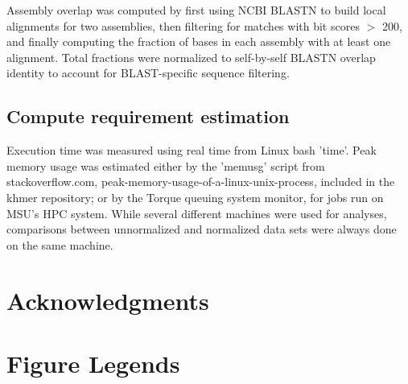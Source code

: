 \documentclass[10pt]{article}
\begin{document}
Assembly overlap was computed by first using NCBI BLASTN to build local
alignments for two assemblies, then filtering for matches with bit scores
$>$ 200, and finally computing the fraction of bases in each assembly
with at least one alignment.  Total fractions were normalized to
self-by-self BLASTN overlap identity to account for BLAST-specific
sequence filtering.

\subsection*{Compute requirement estimation}

Execution time was measured using real time from Linux bash 'time'.
Peak memory usage was estimated either by the 'memusg' script from
stackoverflow.com, peak-memory-usage-of-a-linux-unix-process, included
in the khmer repository; or by the Torque queuing system monitor, for
jobs run on MSU's HPC system.  While several different machines were
used for analyses, comparisons between unnormalized and normalized
data sets were always done on the same machine.

\section*{Acknowledgments}







\newpage

\section*{Figure Legends}
\end{document}
